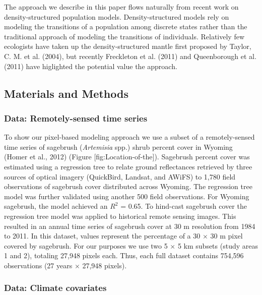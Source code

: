 \documentclass[12pt,]{article}
\begin{document}
The approach we describe in this paper flows naturally from recent work
on density-structured population models. Density-structured models rely
on modeling the transitions of a population among discrete states rather
than the traditional approach of modeling the transitions of
individuals. Relatively few ecologists have taken up the
density-structured mantle first proposed by Taylor, C. M. et al. (2004),
but recently Freckleton et al. (2011) and Queenborough et al. (2011)
have higlighted the potential value the approach.

\subsection{Materials and Methods}\label{materials-and-methods}

\subsubsection{Data: Remotely-sensed time
series}\label{data-remotely-sensed-time-series}

To show our pixel-based modeling approach we use a subset of a
remotely-sensed time series of sagebrush (\emph{Artemisia} spp.) shrub
percent cover in Wyoming (Homer et al., 2012) (Figure
{[}fig:Location-of-the{]}). Sagebrush percent cover was estimated using
a regression tree to relate ground reflectances retrieved by three
sources of optical imagery (QuickBird, Landsat, and AWiFS) to 1,780
field observations of sagebrush cover distributed across Wyoming. The
regression tree model was further validated using another 500 field
observations. For Wyoming sagebrush, the model achieved an \(R^{2}\) =
0.65. To hind-cast sagebrush cover the regression tree model was applied
to historical remote sensing images. This resulted in an annual time
series of sagebrush cover at 30 m resolution from 1984 to 2011. In this
dataset, values represent the percentage of a 30 \(\times\) 30 m pixel
covered by sagebrush. For our purposes we use two 5 \(\times\) 5 km
subsets (study areas 1 and 2), totaling 27,948 pixels each. Thus, each
full dataset contains 754,596 observations (27 years \(\times\) 27,948
pixels).

\subsubsection{Data: Climate covariates}\label{data-climate-covariates}
\end{document}
